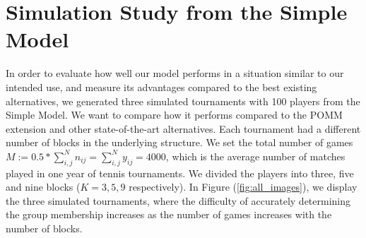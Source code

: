 \documentclass[11pt]{amsart}
\begin{document}
\begin{comment}
\item Prediction error: making prediction on the match score between two players is also possible within this framework. Once we have obtained the MCMC samples, we can retrieve the posterior predictive distribution.

Let us assume $i^\star$ is a new player . The posterior predictive is:
\begin{align}
p(y_{i^\star j}| \textbf{Y}) &= \int p(z| \{ \textbf{Y}\setminus y_{i^\star} \})  \cdot p(y_{i^\star j} | z ) dz \\
&\approx \frac{1}{T} \sum_{t = 1}^{T} \sum_{z_i=1}^{K}  p(y_{i^\star j}| z_j^{(t)}) \\
&=  \frac{1}{T} \sum_{t = 1}^{T} \sum_{z_{i^\star} =1}^{K}  p_{z_{i^\star}, z_j^{(t)}}^{y_{i^\star j} } \cdot (1-p_{z_{i^\star}, z_j^{(t)}})^{n_{i^\star j} -  y_{i^\star j}} \quad \quad \text{for }y_{i^\star j} = 0,\ldots, n_{i^\star j} \\
\end{align} 
where $z_j^{(t)} \sim p(z|Y)$
\end{itemize}
\end{comment}

\clearpage

\section{Simulation Study from the Simple Model}

In order to evaluate how well our model performs in a situation similar to our intended use, and measure its advantages compared to the best existing alternatives, we generated three simulated tournaments with 100 players from the Simple Model. We want to compare how it performs compared to the POMM extension and other state-of-the-art alternatives. Each tournament had a different number of blocks in the underlying structure. We set the total number of games $M := 0.5* \sum_{i,j}^N n_{ij}= \sum_{i,j}^N y_{ij} = 4000$, which is the average number of matches played in one year of tennis tournaments. We divided the players into three, five and nine blocks ($K = 3,5,9$ respectively). In Figure (\ref{fig:all_images}), we display the three simulated tournaments, where the difficulty of accurately determining the group membership increases as the number of games increases with the number of blocks.
\end{document}
